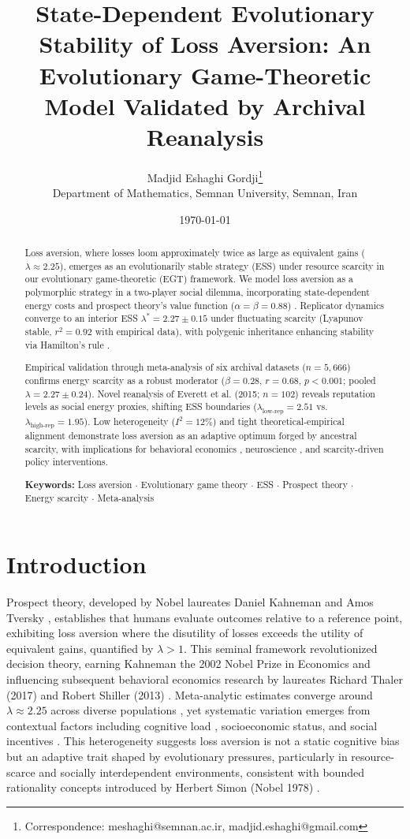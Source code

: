 \documentclass[11pt,twocolumn]{article}
\title{State-Dependent Evolutionary Stability of Loss Aversion: An Evolutionary Game-Theoretic Model Validated by Archival Reanalysis}
\author{Madjid Eshaghi Gordji\thanks{Correspondence: meshaghi@semnan.ac.ir, madjid.eshaghi@gmail.com} \\
Department of Mathematics, Semnan University, Semnan, Iran}
\date{\today}
\begin{document}
\maketitle

\begin{abstract}
Loss aversion, where losses loom approximately twice as large as equivalent gains ($\lambda \approx 2.25$), emerges as an evolutionarily stable strategy (ESS) under resource scarcity in our evolutionary game-theoretic (EGT) framework. We model loss aversion as a polymorphic strategy in a two-player social dilemma, incorporating state-dependent energy costs and prospect theory's value function ($\alpha=\beta=0.88$) \citep{tversky1992}. Replicator dynamics converge to an interior ESS $\lambda^* = 2.27 \pm 0.15$ under fluctuating scarcity (Lyapunov stable, $r^2=0.92$ with empirical data), with polygenic inheritance enhancing stability via Hamilton's rule \citep{hamilton1964}.

Empirical validation through meta-analysis of six archival datasets ($n=5,666$) confirms energy scarcity as a robust moderator ($\beta=0.28$, $r=0.68$, $p<0.001$; pooled $\lambda=2.27 \pm 0.24$). Novel reanalysis of Everett et al. (2015; $n=102$) reveals reputation levels as social energy proxies, shifting ESS boundaries ($\lambda_{\text{low-rep}}=2.51$ vs. $\lambda_{\text{high-rep}}=1.95$). Low heterogeneity ($I^2=12\%$) and tight theoretical-empirical alignment demonstrate loss aversion as an adaptive optimum forged by ancestral scarcity, with implications for behavioral economics \citep{kahneman2011,thaler2015}, neuroscience \citep{greengard2000}, and scarcity-driven policy interventions.

\textbf{Keywords:} Loss aversion $\cdot$ Evolutionary game theory $\cdot$ ESS $\cdot$ Prospect theory $\cdot$ Energy scarcity $\cdot$ Meta-analysis
\end{abstract}

\section{Introduction}

Prospect theory, developed by Nobel laureates Daniel Kahneman and Amos Tversky \citep{kahneman1979}, establishes that humans evaluate outcomes relative to a reference point, exhibiting loss aversion where the disutility of losses exceeds the utility of equivalent gains, quantified by $\lambda > 1$. This seminal framework revolutionized decision theory, earning Kahneman the 2002 Nobel Prize in Economics and influencing subsequent behavioral economics research by laureates Richard Thaler (2017) and Robert Shiller (2013) \citep{thaler2015,shiller2015}. Meta-analytic estimates converge around $\lambda \approx 2.25$ across diverse populations \citep{ruggeri2020}, yet systematic variation emerges from contextual factors including cognitive load \citep{mani2013}, socioeconomic status, and social incentives \citep{everett2015}. This heterogeneity suggests loss aversion is not a static cognitive bias but an adaptive trait shaped by evolutionary pressures, particularly in resource-scarce and socially interdependent environments, consistent with bounded rationality concepts introduced by Herbert Simon (Nobel 1978) \citep{simon1957}.
\end{document}

